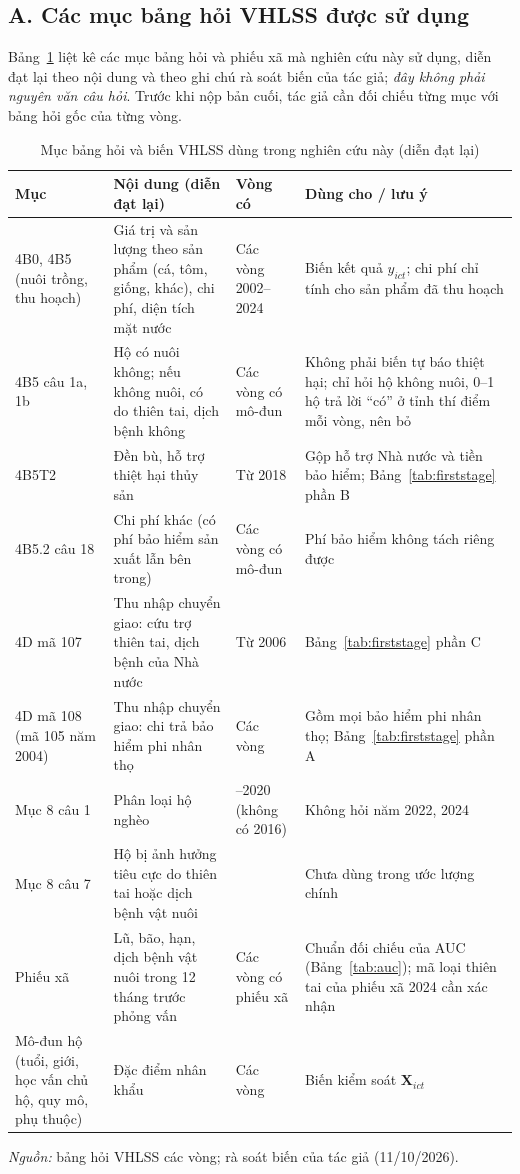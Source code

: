 \documentclass[12pt,a4paper]{article}
\begin{document}
\subsection*{A. Các mục bảng hỏi VHLSS được sử dụng}

Bảng~\ref{tab:quest} liệt kê các mục bảng hỏi và phiếu xã mà nghiên cứu này sử dụng, diễn đạt lại theo nội dung và theo ghi chú rà soát biến của tác giả; \emph{đây không phải nguyên văn câu hỏi}. Trước khi nộp bản cuối, tác giả cần đối chiếu từng mục với bảng hỏi gốc của từng vòng.

\begin{table}[!tbp]
\centering\footnotesize
\caption{Mục bảng hỏi và biến VHLSS dùng trong nghiên cứu này (diễn đạt lại)}
\label{tab:quest}
\begin{tabularx}{\textwidth}{@{}>{\raggedright\arraybackslash}p{2.6cm}>{\raggedright\arraybackslash}X>{\raggedright\arraybackslash}p{2.3cm}>{\raggedright\arraybackslash}p{3.3cm}@{}}
\toprule
Mục & Nội dung (diễn đạt lại) & Vòng có & Dùng cho / lưu ý \\
\midrule
4B0, 4B5 (nuôi trồng, thu hoạch) & Giá trị và sản lượng theo sản phẩm (cá, tôm, giống, khác), chi phí, diện tích mặt nước & Các vòng 2002--2024 & Biến kết quả $y_{ict}$; chi phí chỉ tính cho sản phẩm đã thu hoạch \\
4B5 câu 1a, 1b & Hộ có nuôi không; nếu không nuôi, có do thiên tai, dịch bệnh không & Các vòng có mô-đun & Không phải biến tự báo thiệt hại; chỉ hỏi hộ không nuôi, 0--1 hộ trả lời ``có'' ở tỉnh thí điểm mỗi vòng, nên bỏ \\
4B5T2 & Đền bù, hỗ trợ thiệt hại thủy sản & Từ 2018 & Gộp hỗ trợ Nhà nước và tiền bảo hiểm; Bảng~\ref{tab:firststage} phần B \\
4B5.2 câu 18 & Chi phí khác (có phí bảo hiểm sản xuất lẫn bên trong) & Các vòng có mô-đun & Phí bảo hiểm không tách riêng được \\
4D mã 107 & Thu nhập chuyển giao: cứu trợ thiên tai, dịch bệnh của Nhà nước & Từ 2006 & Bảng~\ref{tab:firststage} phần C \\
4D mã 108 (mã 105 năm 2004) & Thu nhập chuyển giao: chi trả bảo hiểm phi nhân thọ & Các vòng & Gồm mọi bảo hiểm phi nhân thọ; Bảng~\ref{tab:firststage} phần A \\
Mục 8 câu 1 & Phân loại hộ nghèo & 2010--2020 (không có 2016) & Không hỏi năm 2022, 2024 \\
Mục 8 câu 7 & Hộ bị ảnh hưởng tiêu cực do thiên tai hoặc dịch bệnh vật nuôi & 2022 & Chưa dùng trong ước lượng chính \\
Phiếu xã & Lũ, bão, hạn, dịch bệnh vật nuôi trong 12 tháng trước phỏng vấn & Các vòng có phiếu xã & Chuẩn đối chiếu của AUC (Bảng~\ref{tab:auc}); mã loại thiên tai của phiếu xã 2024 cần xác nhận \\
Mô-đun hộ (tuổi, giới, học vấn chủ hộ, quy mô, phụ thuộc) & Đặc điểm nhân khẩu & Các vòng & Biến kiểm soát $\bm{X}_{ict}$ \\
\bottomrule
\end{tabularx}
\begin{minipage}{\textwidth}\footnotesize
\textit{Nguồn:} bảng hỏi VHLSS các vòng; rà soát biến của tác giả (11/10/2026).
\end{minipage}
\end{table}
\end{document}
